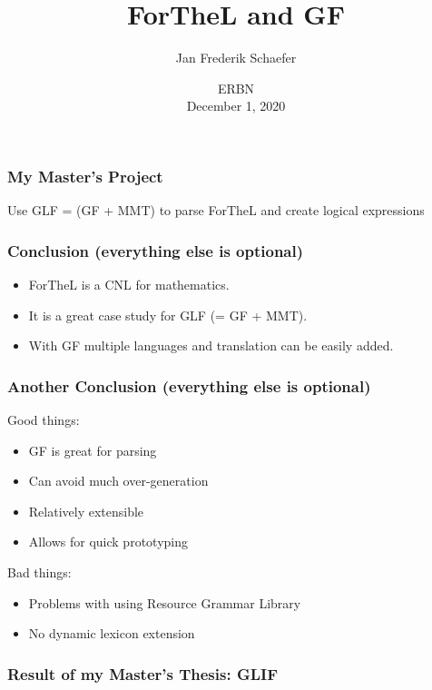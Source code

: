 \documentclass[aspectratio=149]{beamer}
\title{ForTheL and GF}
\author{Jan Frederik Schaefer}
\institute{FAU Erlangen-N\"urnberg}
\date{ERBN \\ December 1, 2020 }
\begin{document}
\frame\titlepage





\begin{frame}
    \frametitle{My Master's Project}
    Use GLF = (GF + MMT) to parse ForTheL and create logical expressions

    \vspace{2em}

    
\end{frame}


\begin{frame}
    \frametitle{Conclusion (everything else is optional)}
    \begin{itemize}
        \item ForTheL is a CNL for mathematics.
        \item It is a great case study for GLF (= GF + MMT).
        \item With GF multiple languages and translation can be easily added.
    \end{itemize}
\end{frame}





\begin{frame}
    \frametitle{Another Conclusion (everything else is optional)}
    Good things:
    \begin{itemize}
        \item GF is great for parsing
        \item Can avoid much over-generation
        \item Relatively extensible
        \item Allows for quick prototyping
    \end{itemize}

    Bad things:
    \begin{itemize}
        \item Problems with using Resource Grammar Library
        \item No dynamic lexicon extension
    \end{itemize}
\end{frame}

\begin{frame}
    \frametitle{Result of my Master's Thesis: GLIF}
    
\end{frame}
\end{document}
